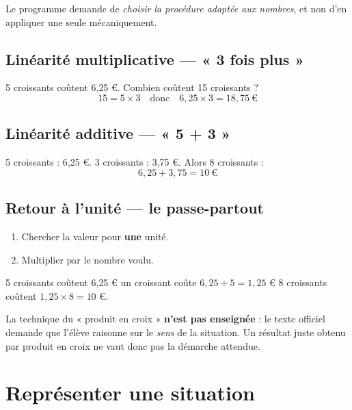 \documentclass{fiche}
\begin{document}
Le programme demande de \emph{choisir la procédure adaptée aux nombres},
et non d'en appliquer une seule mécaniquement.

\subsection{Linéarité multiplicative — « 3 fois plus »}
5 croissants coûtent 6{,}25 €. Combien coûtent 15 croissants ?
\[15 = 5\times 3 \quad\text{donc}\quad 6{,}25\times 3 = 18{,}75\ \text{€}\]

\subsection{Linéarité additive — « 5 + 3 »}
5 croissants : 6{,}25 €. 3 croissants : 3{,}75 €. Alors 8 croissants :
\[6{,}25 + 3{,}75 = 10\ \text{€}\]

\subsection{Retour à l'unité — le passe-partout}
\begin{methode}
\begin{enumerate}[leftmargin=6mm,label=\textbf{\arabic*.}]
  \item Chercher la valeur pour \textbf{une} unité.
  \item Multiplier par le nombre voulu.
\end{enumerate}
\vspace{0.8mm}
5 croissants coûtent 6{,}25 € \fleche{} un croissant coûte
$6{,}25\div 5 = 1{,}25$ € \fleche{} 8 croissants coûtent
$1{,}25\times 8 = 10$ €.
\end{methode}

\begin{center}
\end{center}

\begin{piege}
La technique du « produit en croix » \textbf{n'est pas enseignée} : le texte
officiel demande que l'élève raisonne sur le \emph{sens} de la situation.
Un résultat juste obtenu par produit en croix ne vaut donc pas la démarche attendue.
\end{piege}

\section{Représenter une situation}
\end{document}
